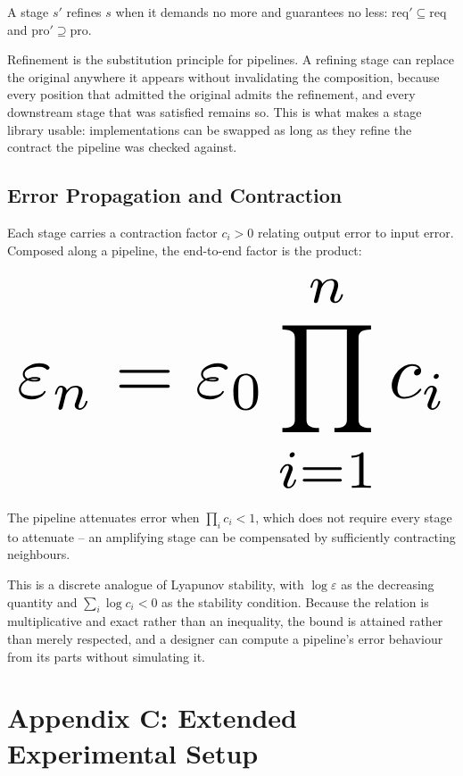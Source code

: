 \documentclass[10pt,journal,compsoc,twocolumn]{IEEEtran}
\begin{document}
A stage $s'$ refines $s$ when it demands no more and guarantees no less: $\mathrm{req}' \subseteq \mathrm{req}$ and $\mathrm{pro}' \supseteq \mathrm{pro}$.

Refinement is the substitution principle for pipelines. A refining stage can replace the original anywhere it appears without invalidating the composition, because every position that admitted the original admits the refinement, and every downstream stage that was satisfied remains so. This is what makes a stage library usable: implementations can be swapped as long as they refine the contract the pipeline was checked against.


\subsection{Error Propagation and Contraction}


Each stage carries a contraction factor $c_i > 0$ relating output error to input error. Composed along a pipeline, the end-to-end factor is the product:








\begin{equation}
\resizebox{\columnwidth}{!}{$\displaystyle
\begin{aligned}
\varepsilon_n = \varepsilon_0 \prod_{i=1}^{n} c_i
\end{aligned}
$}
\end{equation}








The pipeline attenuates error when $\prod_i c_i < 1$, which does not require every stage to attenuate -- an amplifying stage can be compensated by sufficiently contracting neighbours.

This is a discrete analogue of Lyapunov stability, with $\log \varepsilon$ as the decreasing quantity and $\sum_i \log c_i < 0$ as the stability condition. Because the relation is multiplicative and exact rather than an inequality, the bound is attained rather than merely respected, and a designer can compute a pipeline's error behaviour from its parts without simulating it.




\section{Appendix C: Extended Experimental Setup}
\end{document}
